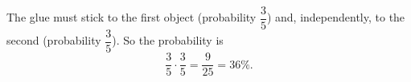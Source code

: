 The glue must stick to the first object (probability $\dfrac35$) and, independently, to the second (probability $\dfrac35$). So the probability is
\[\dfrac35\cdot\dfrac35=\boxed{\dfrac{9}{25}}=36\%.\]

